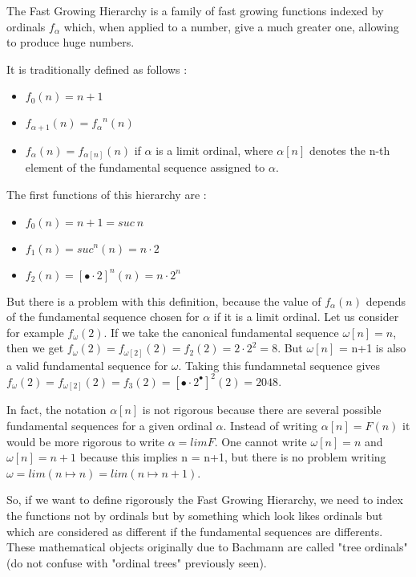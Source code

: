 \documentclass[10pt]{article}
\begin{document}
The Fast Growing Hierarchy is a family of fast growing functions indexed by ordinals \( f_\alpha \) which, when applied to a number, give a much greater one, allowing to produce huge numbers.

It is traditionally defined as follows :

\begin{itemize}
     \setlength{\itemsep}{1pt}
     \setlength{\parskip}{0pt}
     \setlength{\parsep}{0pt}
\item \( f_0(n) = n+1 \)
\item \( f_{\alpha+1}(n) = {f_\alpha}^n(n) \)
\item \( f_\alpha(n) = f_{\alpha[n]}(n) \) if \( \alpha \) is a limit ordinal, where \( \alpha[n] \) denotes the n-th element of the fundamental sequence assigned to \( \alpha \).
\end{itemize}

The first functions of this hierarchy are :

\begin{itemize}
     \setlength{\itemsep}{1pt}
     \setlength{\parskip}{0pt}
     \setlength{\parsep}{0pt}
\item \( f_0(n) = n+1 = suc\ n \)
\item \( f_1(n) = suc^n(n) = n \cdot 2 \)
\item \( f_2(n) = [\bullet \cdot 2]^n(n) = n \cdot 2^n \)
\end{itemize}

But there is a problem with this definition, because the value of \( f_\alpha(n) \) depends of the fundamental sequence chosen for \( \alpha \) if it is a limit ordinal. Let us consider for example \( f_\omega(2) \). If we take the canonical fundamental sequence \( \omega[n] = n \), then we get \( f_\omega(2) = f_{\omega[2]}(2) = f_2(2) = 2 \cdot 2^2 = 8 \). But \( \omega[n] \) = n+1 is also a valid fundamental sequence for \( \omega \). Taking this fundamnetal sequence gives \( f_\omega(2) = f_{\omega[2]}(2) = f_3(2) = [\bullet \cdot 2^\bullet]^2(2) = 2048 \).

In fact, the notation \( \alpha[n] \) is not rigorous because there are several possible fundamental sequences for a given ordinal \( \alpha \). Instead of writing \( \alpha[n] = F(n) \) it would be more rigorous to write \( \alpha = lim F \). One cannot write \( \omega[n] = n \) and \( \omega[n] = n+1 \) because this implies n = n+1, but there is no problem writing \( \omega = lim (n \mapsto n) = lim (n \mapsto n+1) \).

So, if we want to define rigorously the Fast Growing Hierarchy, we need to index the functions not by ordinals but by something which look likes ordinals but which are considered as different if the fundamental sequences are differents. These mathematical objects originally due to Bachmann are called "tree ordinals" (do not confuse with "ordinal trees" previously seen). 
\end{document}
